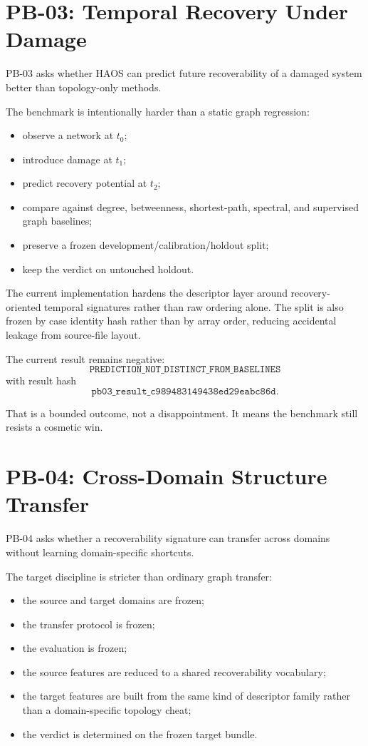 \documentclass[11pt]{article}
\begin{document}
\section{PB-03: Temporal Recovery Under Damage}

PB-03 asks whether HAOS can predict future recoverability of a damaged system better than topology-only methods.

The benchmark is intentionally harder than a static graph regression:
\begin{itemize}
\item observe a network at \(t_0\);
\item introduce damage at \(t_1\);
\item predict recovery potential at \(t_2\);
\item compare against degree, betweenness, shortest-path, spectral, and supervised graph baselines;
\item preserve a frozen development/calibration/holdout split;
\item keep the verdict on untouched holdout.
\end{itemize}

The current implementation hardens the descriptor layer around recovery-oriented temporal signatures rather than raw ordering alone. The split is also frozen by case identity hash rather than by array order, reducing accidental leakage from source-file layout.

The current result remains negative:
\[
\texttt{PREDICTION\_NOT\_DISTINCT\_FROM\_BASELINES}
\]
with result hash
\[
\texttt{pb03\_result\_c989483149438ed29eabc86d}.
\]

That is a bounded outcome, not a disappointment. It means the benchmark still resists a cosmetic win.

\section{PB-04: Cross-Domain Structure Transfer}

PB-04 asks whether a recoverability signature can transfer across domains without learning domain-specific shortcuts.

The target discipline is stricter than ordinary graph transfer:
\begin{itemize}
\item the source and target domains are frozen;
\item the transfer protocol is frozen;
\item the evaluation is frozen;
\item the source features are reduced to a shared recoverability vocabulary;
\item the target features are built from the same kind of descriptor family rather than a domain-specific topology cheat;
\item the verdict is determined on the frozen target bundle.
\end{itemize}
\end{document}
